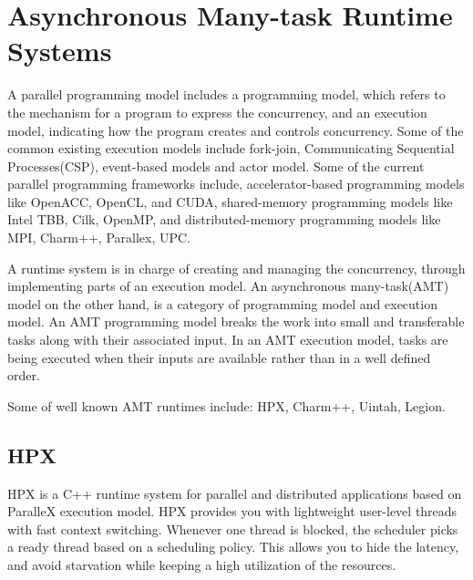 \section{Asynchronous Many-task Runtime Systems}
A parallel programming model includes a programming  model, which refers to the mechanism for a program to express the concurrency, and an execution model, indicating how the program creates and controls concurrency\cite{kulkarni2019comparative, bennett2015asynchronous}.
Some of the common existing execution models include fork-join, Communicating Sequential Processes(CSP), event-based models and actor model\cite{bennett2015asynchronous}. 
Some of the current parallel programming frameworks include, accelerator-based programming models like OpenACC\cite{wienke2012openacc}, OpenCL\cite{munshi2009opencl}, and CUDA\cite{nvidia2011nvidia}, shared-memory programming models like Intel TBB\cite{reinders2007intel}, Cilk\cite{blumofe1996cilk}, OpenMP\cite{dagum1998openmp}, and distributed-memory programming models like MPI\cite{mpi1994message}, Charm++\cite{kale1993charm++}, Parallex\cite{kaiser2009parallex}, UPC\cite{kulkarni2019comparative}.

A runtime system is in charge of creating and managing the concurrency, through implementing parts of an execution model\cite{bennett2015asynchronous}.
An asynchronous many-task(AMT) model on the other hand, is a category of programming model and execution model. 
An AMT programming model breaks the work into small and transferable tasks along with their associated input. In an AMT execution model, tasks are being executed when their inputs are available rather than in a well defined order\cite{bennett2015asynchronous}. 

Some of well known AMT runtimes include: HPX\cite{kaiser2014hpx}, Charm++\cite{kale1993charm++}, Uintah\cite{germain2000uintah}, Legion\cite{bauer2012legion}.

\vspace{\baselineskip}
\subsection{HPX}
HPX\cite{kaiser2014hpx} is a C++ runtime system for parallel and distributed applications based on ParalleX execution model\cite{kaiser2009parallex}. 
HPX provides you with lightweight user-level threads with fast context switching\cite{kulkarni2019comparative}. Whenever one thread is blocked, the scheduler picks a ready thread based on a scheduling policy. This allows you to hide the latency, and avoid starvation while keeping a high utilization of the resources\cite{kulkarni2019comparative}.  

